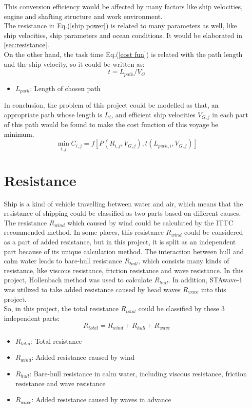 This conversion efficiency would be affected by many factors like ship velocities, engine and shafting structure and work environment.
\\The resistance in Eq.(\ref{ship power}) is related to many parameters as well, like ship velocities, ship parameters and ocean conditions. It would be elaborated in \autoref{sec:resistance}.
\\On the other hand, the task time Eq.(\ref{cost fun}) is related with the path length and the ship velocity, so it could be written as:
\begin{equation}
    t=L_{path}/V_{G}
    \label{task time}
\end{equation}
\begin{itemize}
    \item $L_{path}$: Length of chosen path
\end{itemize}
In conclusion, the problem of this project could be modelled as that, an appropriate path whose length is $L_{i}$, and efficient ship velocities $V_{G,j}$ in each part of this path would be found to make the cost function of this voyage be minimum.
\begin{displaymath}
    \min_{i,j} C_{i,j}=f[P(R_{i,j},V_{G,j}),t(L_{path,i},V_{G,j})]
    \label{modelling}
\end{displaymath}

\section{Resistance}
\label{sec:resistance}
Ship is a kind of vehicle travelling between water and air, which means that the resistance of shipping could be classified as two parts based on different causes. The resistance $R_{wind}$ which caused by wind could be calculated by the ITTC recommended method. In some places, this resistance $R_{wind}$ could be considered as a part of added resistance, but in this project, it is split as an independent part because of its unique calculation method. The interaction between hull and calm water leads to bare-hull resistance $R_{hull}$, which consists many kinds of resistance, like viscous resistance, friction resistance and wave resistance. In this project, Hollenbach method was used to calculate $R_{hull}$. In addition, STAwave-1 was utilized to take added resistance caused by head waves $R_{wave}$ into this project.
\\So, in this project, the total resistance $R_{total}$ could be classified by these 3 independent parts:
\begin{equation}
    R_{total}=R_{wind}+R_{hull}+R_{wave}
    \label{R_total}
\end{equation}
\begin{itemize}
    \item $R_{total}$: Total resistance
    \item $R_{wind}$: Added resistance caused by wind
    \item $R_{hull}$: Bare-hull resistance in calm water, including viscous resistance, friction resistance and wave resistance
    \item $R_{wave}$: Added resistance caused by waves in advance
\end{itemize}
